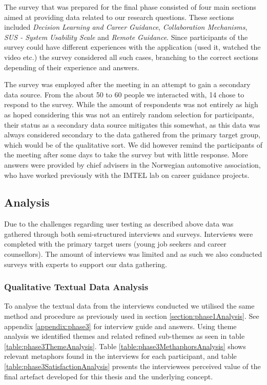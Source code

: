 The survey that was prepared for the final phase consisted of four main sections aimed at providing data related to our research questions. These sections included \textit{Decision Learning and Career Guidance}, \textit{Collaboration Mechanisms}, \textit{SUS - System Usability Scale} and \textit{Remote Guidance}. Since participants of the survey could have different experiences with the application (used it, watched the video etc.) the survey considered all such cases, branching to the correct sections depending of their experience and answers. 

The survey was employed after the meeting in an attempt to gain a secondary data source. From the about 50 to 60 people we interacted with, 14 chose to respond to the survey. While the amount of respondents was not entirely as high as hoped considering this was not an entirely random selection for participants, their status as a secondary data source mitigates this somewhat, as this data was always considered secondary to the data gathered from the primary target group, which would be of the qualitative sort. We did however remind the participants of the meeting after some days to take the survey but with little response. More answers were provided by chief advisers in the Norwegian automotive association, who have worked previously with the IMTEL lab on career guidance projects.    



\subsection{Analysis}
Due to the challenges regarding user testing as described above data was gathered through both semi-structured interviews and surveys. Interviews were completed with the primary target users (young job seekers and career counsellors). The amount of interviews was limited and as such we also conducted surveys with experts to support our data gathering.      


\subsubsection{Qualitative Textual Data Analysis}
To analyse the textual data from the interviews conducted we utilised the same method and procedure as previously used in section \ref{section:phase1Analysis}. See appendix \ref{appendix:phase3} for interview guide and answers. Using theme analysis we identified themes and  related refined sub-themes as seen in table \ref{table:phase3ThemeAnalysis}. Table \ref{table:phase3MethaphorsAnalysis} shows relevant metaphors found in the interviews for each participant, and table \ref{table:phase3SatisfactionAnalysis} presents the interviewees perceived value of the final artefact developed for this thesis and the underlying concept.


